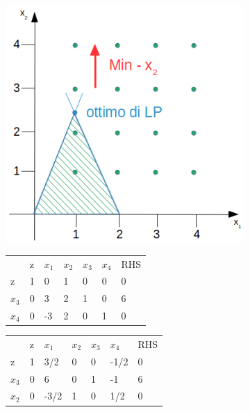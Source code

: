 \centerline{\includegraphics[height=9cm]{images/graph12.png}}

\begin{table}[h]
	\centering
	\begin{tabular}{lllllll}
				&                       z & $x_{1}$ & $x_{2}$  & $x_{3}$ & $x_{4}$ &  RHS  \\ \cline{2-7}
			z	& \multicolumn{1}{|l|}{1} & 0       & 1        & 0       & 0       & \multicolumn{1}{|l|}{0} \\ \cline{2-7}
		$x_{3}$ & \multicolumn{1}{|l|}{0} & 3       & 2        & 1       & 0	   & \multicolumn{1}{|l|}{6} \\
		$x_{4}$ & \multicolumn{1}{|l|}{0} & -3      & \textcircled{2}        & 0       & 1       & \multicolumn{1}{|l|}{0} \\ \cline{2-7}
	\end{tabular}
\end{table}

\begin{table}[!h]
	\centering
	\begin{tabular}{lllllll}
		        &                       z & $x_{1}$ & $x_{2}$  & $x_{3}$ & $x_{4}$ &  RHS  \\ \cline{2-7}
		      z & \multicolumn{1}{|l|}{1} & 3/2     & 0        & 0       & -1/2    & \multicolumn{1}{|l|}{0} \\ \cline{2-7}
		$x_{3}$ & \multicolumn{1}{|l|}{0} & \textcircled{6}   & 0       & 1 & -1  & \multicolumn{1}{|l|}{6} \\
		$x_{2}$ & \multicolumn{1}{|l|}{0} & -3/2    & 1        & 0       & 1/2     & \multicolumn{1}{|l|}{0} \\ \cline{2-7}
	\end{tabular}
\end{table}

